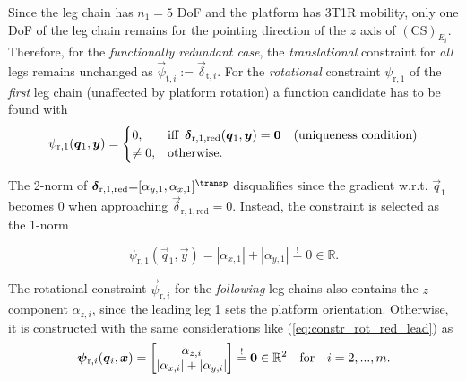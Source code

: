 \documentclass[
	graybox,
	vecphys] %
	{svmult}
\newcommand{\ks}[1]{{(\mathrm{CS})}_{#1}}
\newcommand{\Res}[0]{\vec{\delta}}
\newcommand{\vecResR}[0]{\vec{\psi}}
\newcommand{\ResR}[0]{\psi}
\begin{document}
\vspace{0.1cm} %
Since the leg chain has $n_1=5$ DoF and the platform has 3T1R mobility, only one DoF of the leg chain remains for the pointing direction of the $z$ axis of $\ks{E_i}$.
Therefore, for the \emph{functionally redundant case}, the \emph{translational} constraint for \emph{all} legs remains unchanged as $\vecResR_{\mathrm{t},i}:=\Res_{\mathrm{t},i}$.
For the \emph{rotational} constraint $\ResR_{\mathrm{r},1}$ of the \emph{first} leg chain (unaffected by platform rotation) a function candidate has to be found 
with
%
\vspace{-0.1cm}
\begin{equation}
	\ResR_{\mathrm{r},1}(\vec{q}_1,\vec{y})=
	\begin{cases}
		0,& \text{iff} \enspace \Res_{\mathrm{r},1,\mathrm{red}}(\vec{q}_1,\vec{y})=\vec{0} \quad \mathrm{(uniqueness~condition)} \\
		\ne 0,              & \text{otherwise.}
	\end{cases}
	\vspace{-0.1cm}
\end{equation}

The 2-norm of 
$\Res_{\mathrm{r},1,\mathrm{red}} {=} [
\alpha_{y,1}, \alpha_{x,1}
]^\transp$ 
disqualifies since the gradient w.r.t. $\vec{q}_1$ becomes 0 when approaching $\Res_{\mathrm{r},1,\mathrm{red}}{=}0$.
Instead, the constraint is selected as the 1-norm 

\vspace{-0.5cm}
\begin{equation}
\ResR_{\mathrm{r},1}(\vec{q}_1,\vec{y})
=
|\alpha_{x,1}| + |\alpha_{y,1}|
\overset{!}{=}
0
\in {\mathbb{R}}.
\label{eq:constr_rot_red_lead}
\end{equation}

The rotational constraint $\vecResR_{\mathrm{r},i}$ for the \emph{following} leg chains also contains the $z$ component $\alpha_{z,i}$, since the leading leg 1 sets the platform orientation.
Otherwise, it is constructed with the same considerations like (\ref{eq:constr_rot_red_lead}) as
%
\begin{equation}
\vecResR_{\mathrm{r},i}(\vec{q}_i,\vec{x})
=
\begin{bmatrix}
\alpha_{z,i} \\
|\alpha_{x,i}| + |\alpha_{y,i}|
\end{bmatrix} 
\overset{!}{=}
\vec{0}
\in {\mathbb{R}}^{2}
\quad \mathrm{for} \quad i=2,...,m.
\label{eq:constr_rot_red_follow}
\vspace{-0.1cm}
\end{equation}
\end{document}
